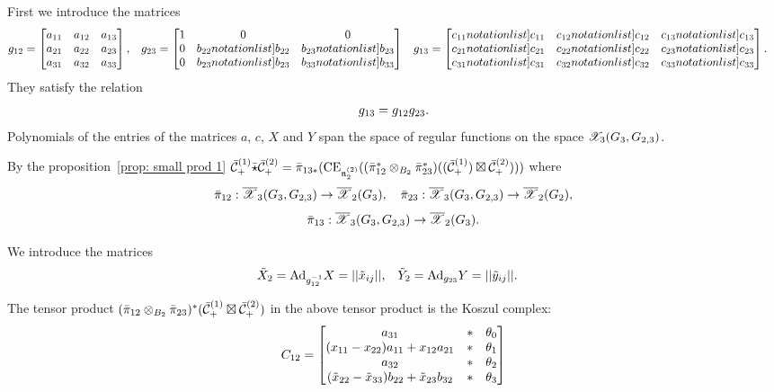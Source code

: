 First we introduce the matrices
\begin{align*}
\xgot & = \xbmtr{\exaoo & \exaot & \exaoh\\ \exato & \exatt & \exath \\ \exaho & \exaht & \exahh}, &
\xgth &= \xbmtr{ 1& 0 & 0 \\ 0 & \SymbolPrint{\exbtt} & \SymbolPrint{\exbth} \\ 0 & \SymbolPrint{\exbth} & \SymbolPrint{\exbhh}} &
                                                                                                                         \xgoh & = \xbmtr{\SymbolPrint{\excoo} & \SymbolPrint{\excot} & \SymbolPrint{\excoh}\\
  \SymbolPrint{\excto} & \SymbolPrint{\exctt} & \SymbolPrint{\excth} \\ \SymbolPrint{ \excho} & \SymbolPrint{\excht} & \SymbolPrint{\exchh}}.
\end{align*}
They satisfy the relation
\[
g_{13} = g_{12} g_{23}.
\]
Polynomials of the entries of the matrices  $a$, $c$, $X$ and $Y$ span the space of regular functions on the space $\mathscr{X}_3(G_3,G_{2,3})$.


By the proposition~\ref{prop: small prod 1} $\bar{\mathcal{C}}^{(1)}_+\bar{\star}\bar{\mathcal{C}}^{(2)}_+=
\bar{\pi}_{13*}(\mathrm{CE}_{\mathfrak{n}^{(2)}_2}((\bar{\pi}^*_{12}\otimes_{B_2} \bar{\pi}^*_{23})( (\bar{\mathcal{C}}_+^{(1)})\boxtimes\bar{\mathcal{C}}_+^{(2)})))$ where
$$\bar{\pi}_{12}:\overline{\mathscr{X}}_3(G_3,G_{2,3})\to \overline{\mathscr{X}}_2(G_3),\quad \bar{\pi}_{23}: \overline{\mathscr{X}}_3(G_3,G_{2,3})\to \overline{\mathscr{X}}_2(G_2), $$
$$\bar{\pi}_{13}:\overline{\mathscr{X}}_3(G_3,G_{2,3})\to \overline{\mathscr{X}}_2(G_3).$$



We introduce the matrices
\def\xtX{ \tilde{\xX}}
\def\tXt{\xtX_2}
\def\tXtp{\tXt^+}
\def\tXtm{\tXt^-}
\def\xtY{ \tilde{\xY} }
\def\tYt{ \xtY_2 }
\def\ty{ \tilde{y} }
\begin{align*}
\tXt & = \Adv{\xigot}\xX = ||\tx_{ij} ||, &
\tYt& =  \Adv{\xgth} \xY = || \ty_{ij} ||.
\end{align*}


The tensor product $(\bar{\pi}_{12}\otimes_{B_2} \bar{\pi}_{23})^* (\bar{\mathcal{C}}_+^{(1)}\boxtimes\bar{\mathcal{C}}_+^{(2)})$ in the above tensor product is the Koszul complex:
\[ C_{12}=
\begin{bmatrix} 
a_{31}&*&\theta_0\\
(x_{11}-x_{22})a_{11} + x_{12}a_{21} & * &\theta_1
\\
a_{32} & * &\theta_2
\\
(\tilde{x}_{22}-\tilde{x}_{33})b_{22} + \tilde{x}_{23}b_{32} & * &\theta_3
 \end{bmatrix}
\]



